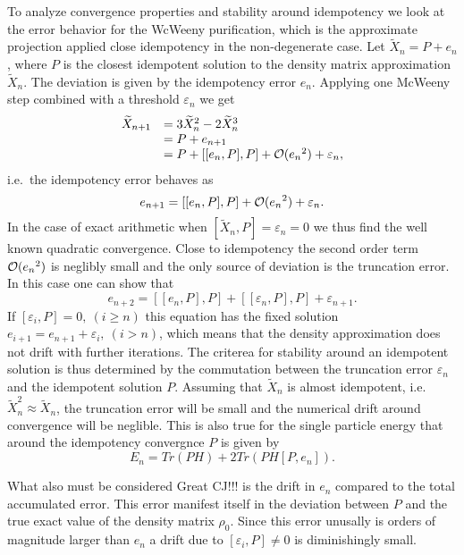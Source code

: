 \commentoutA{\documentclass[superbib,aps,prb,epsfig,floats,twocolumn]{revtex4}}
\begin{document}
To analyze convergence properties and stability around idempotency
we look at the error behavior for the WcWeeny purification,
which is the approximate projection applied close idempotency
in the non-degenerate case. Let ${ \widetilde X }_n = P + e_n$,
where $P$ is the closest idempotent solution to the density matrix
approximation ${ \widetilde X }_n$. The deviation is given by
the idempotency error $e_n$. Applying one McWeeny step 
combined with a threshold $\varepsilon_n$ we get
\begin{equation}
\begin{array}{ll}
{ \widetilde X }_{n+1} &= 3{ \widetilde X }_{n}^2-2{ \widetilde X }_{n}^3\\
&=P+e_{n+1} \\ & = P + \left[ [e_n,P],P\right] + {\cal O}({e_n}^2) + \varepsilon_n,
\end{array}
\end{equation}
i.e.\ the idempotency error behaves as
\begin{equation}
e_{n+1} =  \left[ [e_n,P],P\right] + {\cal O}({e_n}^2) + \varepsilon_n.
\end{equation}
In the case of exact arithmetic when $[{ \widetilde X }_n,P]= \varepsilon_n=0$
we thus find the well known quadratic convergence. Close to idempotency
the second order term ${\cal O}({e_n}^2)$ is neglibly small and the
only source of deviation is the truncation error. 
In this case one can show that
\begin{equation}
e_{n+2} =  \left[ [e_n,P],P\right] + \left[ [\varepsilon_n,P],P\right] + \varepsilon_{n+1}.
\end{equation}
If $[\varepsilon_i,P] = 0,~ (i \ge n)$ this equation 
has the fixed solution $e_{i+1} = e_{n+1} + \varepsilon_{i},~ (i > n)$, which means that the
density approximation does not drift with further iterations.
The criterea for stability around an idempotent solution is thus
determined by the commutation between the truncation error $\varepsilon_n$ and
the idempotent solution $P$. Assuming that ${ \widetilde X }_{n}$ is almost
idempotent, i.e. ${ \widetilde X }_{n}^2 \approx { \widetilde X }_{n}$,
the truncation error will be small and the numerical drift around
convergence will be neglible. This is also true for the single particle 
energy that around the idempotency convergnce $P$ is given by
\begin{equation}
E_n = Tr(PH) + 2Tr(PH[P,e_n]).
\end{equation}

What also must be considered {Great CJ!!!} is the drift in $e_n$ compared
to the total accumulated error. This error manifest itself in the
deviation between $P$ and the true exact value of the density matrix $\rho_0$.
Since this error unusally is orders of magnitude larger than $e_n$
a drift due to $[\varepsilon_i,P] \ne 0$ is diminishingly small.
\end{document}
